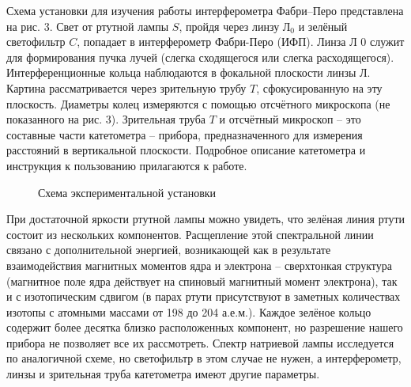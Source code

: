 Схема установки для изучения работы интерферометра Фабри–Перо представлена на рис. 3. Свет от 
ртутной лампы $S$, пройдя через линзу $\text{Л}_0$ и зелёный светофильтр $C$, попадает в интерферометр 
Фабри-Перо (ИФП). Линза Л 0 служит для формирования пучка лучей (слегка сходящегося или 
слегка расходящегося). Интерференционные кольца наблюдаются в фокальной плоскости линзы $\text{Л}$.
Картина рассматривается через зрительную трубу $T$, сфокусированную на эту плоскость. 
Диаметры колец измеряются с помощью отсчётного микроскопа (не показанного на рис. 3).
Зрительная труба $T$ и отсчётный микроскоп -- это составные части катетометра -- прибора, 
предназначенного для измерения расстояний в вертикальной плоскости. Подробное описание 
катетометра и инструкция к пользованию прилагаются к работе.

\begin{figure}[h!]
  \caption{Схема экспериментальной установки}
  \label{img::3}
\end{figure}

При достаточной яркости ртутной лампы можно увидеть, что зелёная линия ртути состоит из 
нескольких компонентов. Расщепление этой спектральной линии связано с дополнительной энергией,
возникающей как в результате взаимодействия магнитных моментов ядра и электрона -- сверхтонкая
структура (магнитное поле ядра действует на спиновый магнитный момент электрона), так и с
изотопическим сдвигом (в парах ртути присутствуют в заметных количествах изотопы с атомными 
массами от 198 до 204 а.е.м.). Каждое зелёное кольцо содержит более десятка близко 
расположенных компонент, но разрешение нашего прибора не позволяет все их рассмотреть.
Спектр натриевой лампы исследуется по аналогичной схеме, но светофильтр в этом случае не нужен, 
а интерферометр, линзы и зрительная труба катетометра имеют другие параметры.